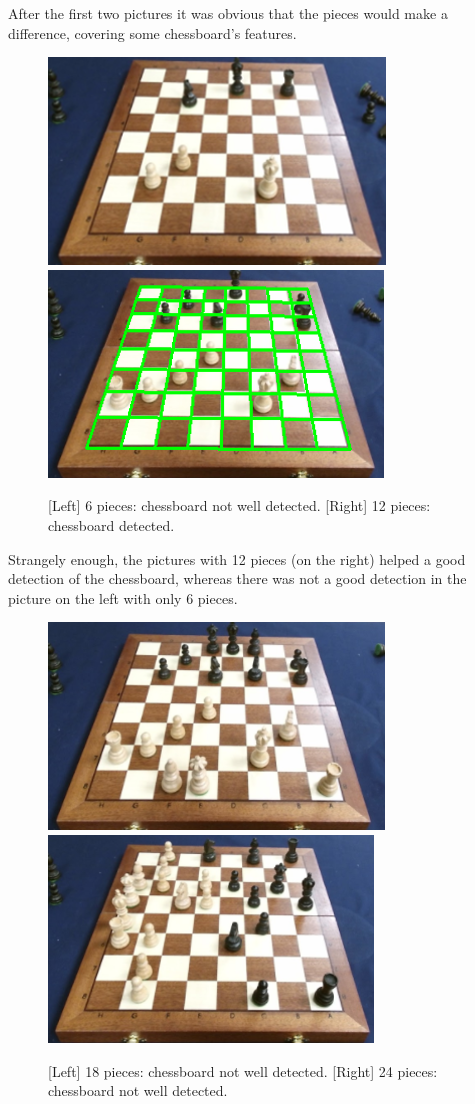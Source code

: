 \documentclass{l4proj}
\begin{document}
After the first two pictures it was obvious that the pieces would make a difference, covering some chessboard's features.

\begin{figure}[h!]
\includegraphics[scale=0.75]{tb2.png} \includegraphics[scale=0.75]{1tb3.png}
\caption{[Left] 6 pieces: chessboard not well detected. [Right] 12 pieces: chessboard detected.}
\label{tb23}
\end{figure}

\pagebreak
Strangely enough, the pictures with 12 pieces (on the right) helped a good detection of the chessboard, whereas there was not a good detection in the picture on the left with only 6 pieces.


\begin{figure}[h!]
\includegraphics[scale=0.75]{tb4.png} \includegraphics[scale=0.75]{tb5.png}
\caption{[Left] 18 pieces: chessboard not well detected. [Right] 24 pieces: chessboard not well detected.}
\label{tb45}
\end{figure}
\end{document}
